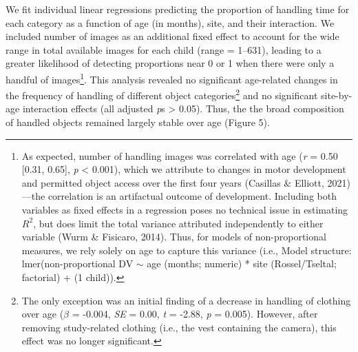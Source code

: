 \documentclass[10pt, letterpaper]{article}
\begin{document}
We fit individual linear regressions predicting the proportion of
handling time for each category as a function of age (in months), site,
and their interaction. We included number of images as an additional
fixed effect to account for the wide range in total available images for
each child (range = 1--631), leading to a greater likelihood of
detecting proportions near 0 or 1 when there were only a handful of
images\footnote{As expected, number of handling images was correlated
  with age (\emph{r} = 0.50 {[}0.31, 0.65{]}, \emph{p} \textless{}
  0.001), which we attribute to changes in motor development and
  permitted object access over the first four years (Casillas \&
  Elliott, 2021)---the correlation is an artifactual outcome of
  development. Including both variables as fixed effects in a regression
  poses no technical issue in estimating \(R^{2}\), but does limit the
  total variance attributed independently to either variable (Wurm \&
  Fisicaro, 2014). Thus, for models of non-proportional measures, we
  rely solely on age to capture this variance (i.e., Model structure:
  lmer(non-proportional DV \({\sim}\) age (months; numeric) * site
  (Rossel/Tseltal; factorial) + (1 \textbar{} child)).}. This analysis
revealed no significant age-related changes in the frequency of handling
of different object categories\footnote{The only exception was an
  initial finding of a decrease in handling of clothing over age
  (\(\beta\) = -0.004, \emph{SE} = 0.00, \emph{t} = -2.88, \emph{p} =
  0.005). However, after removing study-related clothing (i.e., the vest
  containing the camera), this effect was no longer significant.} and no
significant site-by-age interaction effects (all adjusted \emph{p}s
\textgreater{} 0.05). Thus, the the broad composition of handled objects
remained largely stable over age (Figure 5).
\end{document}
